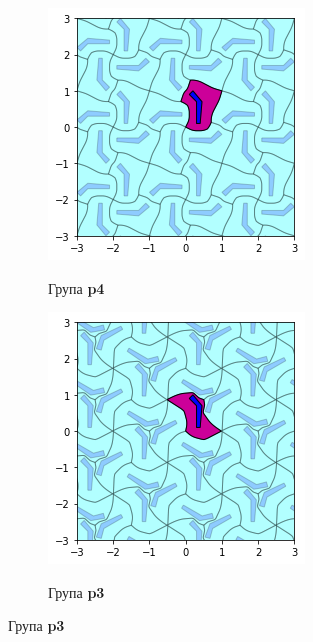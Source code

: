 \documentclass[12pt]{article}
\begin{document}
\begin{samepage}
\begin{figure}[H]
  \begin{subfigure}[b]{0.3\textwidth}
    \includegraphics[width=\textwidth]{output_21_4.png}
    \label{fig:f23}
    \caption{Група \textbf{p4}}
  \end{subfigure}
  \begin{subfigure}[b]{0.3\textwidth}
    \includegraphics[width=\textwidth]{output_21_3.png}
    \label{fig:f22}
    \caption{Група \textbf{p3}}
  

\end{subfigure}
\end{figure}
\end{samepage}
\end{document}
